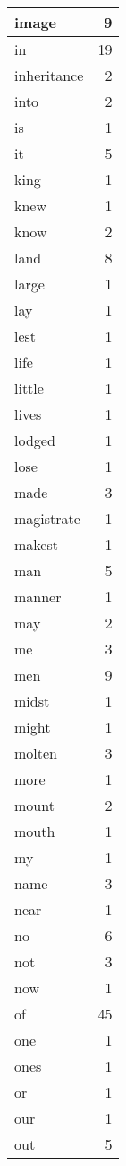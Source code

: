 \begin{center}
\begin{longtable}{l|r}
image & 9\\ \hline 
in & 19\\ \hline 
inheritance & 2\\ \hline 
into & 2\\ \hline 
is & 1\\ \hline 
it & 5\\ \hline 
king & 1\\ \hline 
knew & 1\\ \hline 
know & 2\\ \hline 
land & 8\\ \hline 
large & 1\\ \hline 
lay & 1\\ \hline 
lest & 1\\ \hline 
life & 1\\ \hline 
little & 1\\ \hline 
lives & 1\\ \hline 
lodged & 1\\ \hline 
lose & 1\\ \hline 
made & 3\\ \hline 
magistrate & 1\\ \hline 
makest & 1\\ \hline 
man & 5\\ \hline 
manner & 1\\ \hline 
may & 2\\ \hline 
me & 3\\ \hline 
men & 9\\ \hline 
midst & 1\\ \hline 
might & 1\\ \hline 
molten & 3\\ \hline 
more & 1\\ \hline 
mount & 2\\ \hline 
mouth & 1\\ \hline 
my & 1\\ \hline 
name & 3\\ \hline 
near & 1\\ \hline 
no & 6\\ \hline 
not & 3\\ \hline 
now & 1\\ \hline 
of & 45\\ \hline 
one & 1\\ \hline 
ones & 1\\ \hline 
or & 1\\ \hline 
our & 1\\ \hline 
out & 5\\ \hline 

\end{longtable}
\end{center}
